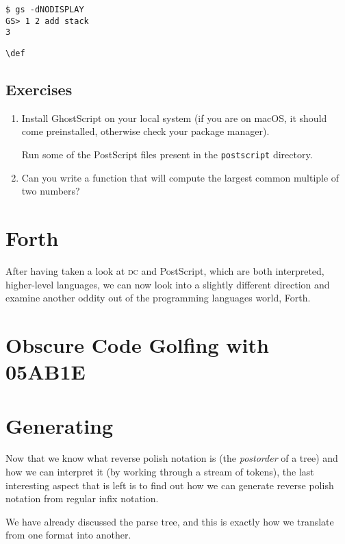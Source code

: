 \documentclass[a4paper,twocolumn]{article}
\begin{document}
\begin{verbatim}
$ gs -dNODISPLAY
GS> 1 2 add stack
3
\end{verbatim}




\begin{verbatim}
\def  
\end{verbatim}


\subsection*{Exercises}

\begin{enumerate}
  \item Install GhostScript on your local system (if you are on macOS, it should come preinstalled, otherwise check your package manager).

    Run some of the PostScript files present in the \verb|postscript| directory. 
  \item Can you write a function that will compute the largest common multiple of two numbers?
\end{enumerate}

\section{Forth}

After having taken a look at \textsc{dc} and PostScript, which are both interpreted, higher-level languages, we can now look into a slightly different direction and examine another oddity out of the programming languages world, Forth. 

\section{Obscure Code Golfing with 05AB1E}



\section{Generating}

Now that we know what reverse polish notation is (the \emph{postorder} of a tree) and how we can interpret it (by working through a stream of tokens), the last interesting aspect that is left is to find out how we can generate reverse polish notation from regular infix notation. 

We have already discussed the parse tree, and this is exactly how we translate from one format into another.
\end{document}
